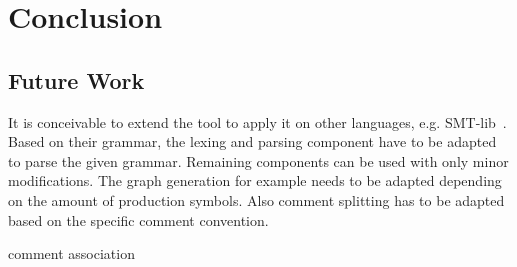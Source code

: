 
\chapter{Conclusion}\label{cha:Conclusion}

\section{Future Work}\label{sec:FutureWork}
It is conceivable to extend the tool to apply it on other languages, e.g. SMT-lib~\cite{BFT-SMTLIB-17}. 
Based on their grammar, the lexing and parsing component have to be adapted to parse the given grammar. Remaining components can be used with only minor modifications. The graph generation for example needs to be adapted depending on the amount of production symbols. Also comment splitting has to be adapted based on the specific comment convention.



comment association